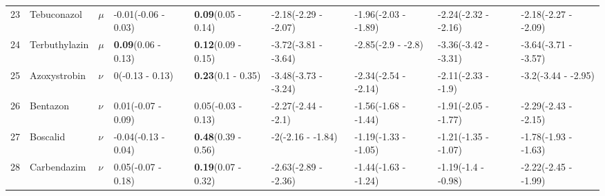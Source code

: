 \begin{longtable}{lp{2cm}p{0.6cm}p{1.8cm}p{1.8cm}p{1.8cm}p{1.8cm}p{1.8cm}p{1.8cm}}
  23 & Tebuconazol & $\mu$ & -0.01\newline (-0.06 - 0.03) & \textbf{0.09}\newline (0.05 - 0.14) & -2.18\newline (-2.29 - -2.07) & -1.96\newline (-2.03 - -1.89) & -2.24\newline (-2.32 - -2.16) & -2.18\newline (-2.27 - -2.09) \\ 
  24 & Terbuthylazin & $\mu$ & \textbf{0.09}\newline (0.06 - 0.13) & \textbf{0.12}\newline (0.09 - 0.15) & -3.72\newline (-3.81 - -3.64) & -2.85\newline (-2.9 - -2.8) & -3.36\newline (-3.42 - -3.31) & -3.64\newline (-3.71 - -3.57) \\ 
   \midrule
25 & Azoxystrobin & $\nu$ & 0\newline (-0.13 - 0.13) & \textbf{0.23}\newline (0.1 - 0.35) & -3.48\newline (-3.73 - -3.24) & -2.34\newline (-2.54 - -2.14) & -2.11\newline (-2.33 - -1.9) & -3.2\newline (-3.44 - -2.95) \\ 
  26 & Bentazon & $\nu$ & 0.01\newline (-0.07 - 0.09) & 0.05\newline (-0.03 - 0.13) & -2.27\newline (-2.44 - -2.1) & -1.56\newline (-1.68 - -1.44) & -1.91\newline (-2.05 - -1.77) & -2.29\newline (-2.43 - -2.15) \\ 
  27 & Boscalid & $\nu$ & -0.04\newline (-0.13 - 0.04) & \textbf{0.48}\newline (0.39 - 0.56) & -2\newline (-2.16 - -1.84) & -1.19\newline (-1.33 - -1.05) & -1.21\newline (-1.35 - -1.07) & -1.78\newline (-1.93 - -1.63) \\ 
  28 & Carbendazim & $\nu$ & 0.05\newline (-0.07 - 0.18) & \textbf{0.19}\newline (0.07 - 0.32) & -2.63\newline (-2.89 - -2.36) & -1.44\newline (-1.63 - -1.24) & -1.19\newline (-1.4 - -0.98) & -2.22\newline (-2.45 - -1.99) \\ 

\end{longtable}
